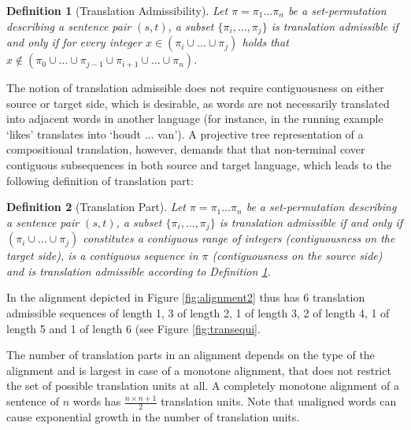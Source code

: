 \documentclass{report}
\theoremstyle{break}
\newtheorem{definition}{Definition}
\begin{document}
\begin{definition}[Translation Admissibility]\label{def:transadd}
Let $\pi = \pi_1 \ldots \pi_n$ be a set-permutation describing a sentence pair $(s,t)$, a subset $\{\pi_i,\ldots,\pi_j\}$ is translation admissible if and only if for every integer $x \in (\pi_i\cup \ldots \cup\pi_j)$ holds that $x \notin (\pi_0\cup \ldots \cup \pi_{j-1} \cup \pi_{i+1}\cup\ldots\cup \pi_n)$.
\end{definition}

\noindent The notion of translation admissible does not require contiguousness on either source or target side, which is desirable, as words are not necessarily translated into adjacent words in another language (for instance, in the running example `likes' translates into `houdt ... van'). A projective tree representation of a compositional translation, however, demands that that non-terminal cover contiguous subsequences in both source and target language, which leads to the following definition of translation part:

\begin{definition}[Translation Part]\label{def:transpart}
Let $\pi = \pi_1 \ldots \pi_n$ be a set-permutation describing a sentence pair $(s,t)$, a subset $\{\pi_i,\ldots,\pi_j\}$ is translation admissible if and only if $(\pi_i\cup \ldots \cup \pi_j)$ constitutes a contiguous range of integers (contiguousness on the target side), is a contiguous sequence in $\pi$ (contiguousness on the source side) and is translation admissible according to Definition \ref{def:transadd}.
\end{definition}

\noindent In the alignment depicted in Figure \ref{fig:alignment2} thus has 6 translation admissible sequences of length 1, 3 of length 2, 1 of length 3, 2 of length 4, 1 of length 5 and 1 of length 6 (see Figure \ref{fig:transequi}.

The number of translation parts in an alignment depends on the type of the alignment and is largest in case of a monotone alignment, that does not restrict the set of possible translation units at all. A completely monotone alignment of a sentence of $n$ words has $\frac{n\times n+1}{2}$ translation units. Note that unaligned words can cause exponential growth in the number of translation units.
\end{document}
